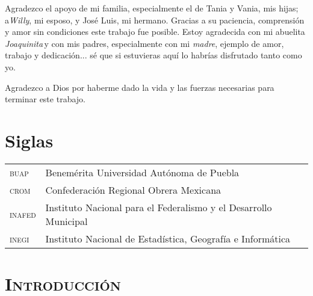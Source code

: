 \documentclass[14pt,letterpaper,twoside]{extbook} %
\begin{document}
Agradezco el apoyo de mi familia, especialmente el de Tania y Vania, mis hijas; a\textit{Willy}, mi esposo, y José Luis, mi hermano. Gracias a su paciencia, comprensión y amor sin condiciones este trabajo fue posible. Estoy agradecida con mi abuelita \textit{Joaquinita}\textsuperscript\textdagger\,y con mis padres, especialmente con mi \textit{madre}\textsuperscript\textdagger, ejemplo de amor, trabajo y dedicación... sé que si estuvieras aquí lo habrías disfrutado tanto como yo.

Agradezco a Dios por haberme dado la vida y las fuerzas necesarias para terminar este trabajo.


\cleardoublepage
\pagestyle{fancy}
\fancyhf{}
\fancyfoot[RO,LE]{\hfill \thepage \hfill}
\renewcommand{\headrulewidth}{0pt}
\setcounter{page}{13}
\renewcommand{\contentsname}{Contenido}


\makeatletter
\renewcommand\@dotsep{200}
\makeatother

\tableofcontents
{}
\cleardoublepage
\renewcommand{\listfigurename}{Imágenes}
\listoffigures
{}

\chapter*{Siglas}
\pagestyle{empty}
\setcounter{page}{19}
\begin{tabular}{ll}
\textsc{buap} & Benemérita Universidad Autónoma de Puebla \\
\textsc{crom} & Confederación Regional Obrera Mexicana \\
\textsc{inafed} & Instituto Nacional para el Federalismo y el Desarrollo Municipal \\
\textsc{inegi} & Instituto Nacional de Estadística, Geografía e Informática \\
\end{tabular} 

\chapter*{\centering\mdseries\Large\textsc{Introducción}}
\pagestyle{fancy}
\fancyhf{}
\fancyfoot[RO,LE]{\hfill \thepage \hfill}
\renewcommand{\headrulewidth}{0pt}
\setcounter{page}{21}
\end{document}

